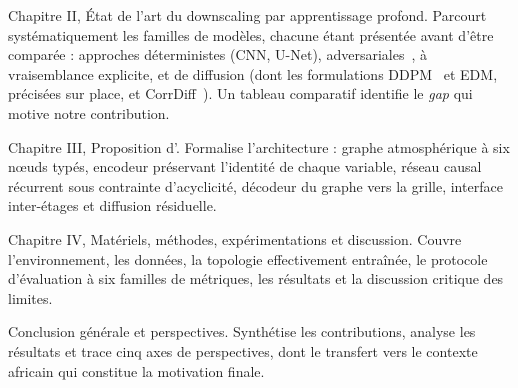 Chapitre II, État de l'art du downscaling par apprentissage profond. Parcourt systématiquement les familles de modèles, chacune étant présentée avant d'être comparée : approches déterministes (CNN, U-Net), adversariales~\cite{rampal_cgan_2024}, à vraisemblance explicite, et de diffusion (dont les formulations DDPM~\cite{ho_ddpm_2020} et EDM, précisées sur place, et CorrDiff~\cite{mardani_corrdiff_2023}). Un tableau comparatif identifie le \emph{gap} qui motive notre contribution.

Chapitre III, Proposition d'\Oracle{}. Formalise l'architecture : graphe atmosphérique à six nœuds typés, encodeur préservant l'identité de chaque variable, réseau causal récurrent sous contrainte d'acyclicité, décodeur du graphe vers la grille, interface inter-étages et diffusion résiduelle.

Chapitre IV, Matériels, méthodes, expérimentations et discussion. Couvre l'environnement, les données, la topologie effectivement entraînée, le protocole d'évaluation à six familles de métriques, les résultats et la discussion critique des limites.

Conclusion générale et perspectives. Synthétise les contributions, analyse les résultats et trace cinq axes de perspectives, dont le transfert vers le contexte africain qui constitue la motivation finale.

